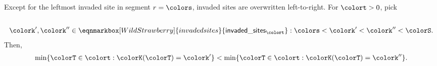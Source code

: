 \begin{lemma}
\label{thm:tilted-invading-overwrite-order}
Except for the leftmost invaded site in segment $r=\colors$, invaded sites are overwritten left-to-right. For $\colort > 0$, pick
\begin{align*}
\\
\colork',\colork''
\in
\eqnmarkbox[WildStrawberry]{invadedsites}{
  \mathsf{invaded\_sites}_{\colort}
}
: \colors < \colork' < \colork'' < \colorS.
\end{align*}
Then,
\begin{align*}
\min\{
  \colorT \in \colort
  : \colorK(\colorT) = \colork'
\}
<
\min\{
  \colorT \in \colort
  : \colorK(\colorT) = \colork''
\}.
\end{align*}

\end{lemma}

